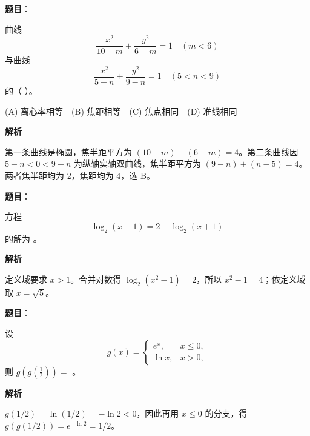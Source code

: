 \begin{answer}

\textbf{题目}：

曲线
\nopagebreak[4]
\[
\frac{x^2}{10-m}+\frac{y^2}{6-m}=1\quad(m<6)
\]
与曲线
\nopagebreak[4]
\[
\frac{x^2}{5-n}+\frac{y^2}{9-n}=1\quad(5<n<9)
\]
的（ ）。

(A) 离心率相等　(B) 焦距相等　(C) 焦点相同　(D) 准线相同

\textbf{解析}

第一条曲线是椭圆，焦半距平方为 $(10-m)-(6-m)=4$。第二条曲线因 $5-n<0<9-n$ 为纵轴实轴双曲线，焦半距平方为 $(9-n)+(n-5)=4$。两者焦半距均为 2，焦距均为 4，选 B。


\end{answer}
\begin{answer}

\textbf{题目}：

方程
\nopagebreak[4]
\[
\log_2(x-1)=2-\log_2(x+1)
\]
的解为 \gkblank{}。

\textbf{解析}

定义域要求 $x>1$。合并对数得 $\log_2(x^2-1)=2$，所以 $x^2-1=4$；依定义域取 $x=\sqrt5$。


\end{answer}
\begin{answer}

\textbf{题目}：

设
\nopagebreak[4]
\[
g(x)=\begin{cases}e^x,&x\le 0,\\\ln x,&x>0,\end{cases}
\]
则 \(g\left(g\left(\frac12\right)\right)=\) \gkblank{}。

\textbf{解析}

$g(1/2)=\ln(1/2)=-\ln2<0$，因此再用 $x\le0$ 的分支，得 $g(g(1/2))=e^{-\ln2}=1/2$。


\end{answer}
